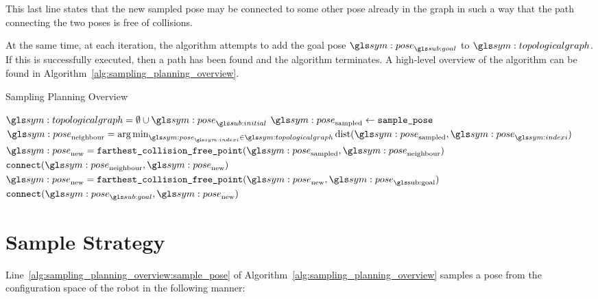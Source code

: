 		This last line states that the new sampled pose may be connected to some
		other pose already in the graph in such a way that the path connecting
		the two poses is free of collisions.

		At the same time, at each iteration, the algorithm attempts to add the
		goal pose $\pose_{\goal}$ to $\topologicalgraph$. If this is
		successfully executed, then a path has been found and the algorithm
		terminates. A high-level overview of the algorithm can be found in
		Algorithm~\ref{alg:sampling_planning_overview}.

		\begin{algorithm}[ht]
			\caption{Sampling Planning Overview}%
			\label{alg:sampling_planning_overview}
			\begin{algorithmic}[1]
					\State{}$\topologicalgraph = \emptyset \cup \pose_{\initial}$
					\While{$\pose_{\goal} \notin \topologicalgraph$}
						\Repeat{}
							\State{}$\pose_\text{sampled} \leftarrow
							\code{sample\_pose}$\label{alg:sampling_planning_overview:sample_pose}
						\Until{$\robot(\pose) \notin \configurationspace_{\obstacleregion}$}
						\State{}
							\(
								\pose_{\text{neighbour}} =
								\argmin_{\pose_{\indexi} \in
								\topologicalgraph}\dist(\pose_\text{sampled}, \pose_{\indexi})
							\)
						\State{}$\pose_\text{new} =
							\code{farthest\_collision\_free\_point}(\pose_{\text{sampled}},
							\pose_{\text{neighbour}})$\label{alg:sampling_planning_overview:farthest_collision_free_point_sampled}
						\State{}$\code{connect}(\pose_\text{neighbour},
							\pose_\text{new})$
						\State{}$\pose_\text{new} =
							\code{farthest\_collision\_free\_point}(\pose_{\text{new}},
							\pose_{\text{\goal}})$\label{alg:sampling_planning_overview:farthest_collision_free_point_goal}
							\State{}$\code{connect}(\pose_{\goal},
								\pose_\text{new})$
						\EndIf{}
					\EndWhile{}
				\EndProcedure{}
			\end{algorithmic}
		\end{algorithm}

	\section{Sample Strategy}%
	\label{sec:sample_strategy}

		Line~\ref{alg:sampling_planning_overview:sample_pose} of
		Algorithm~\ref{alg:sampling_planning_overview} samples a pose from the
		configuration space of the robot in the following manner:

